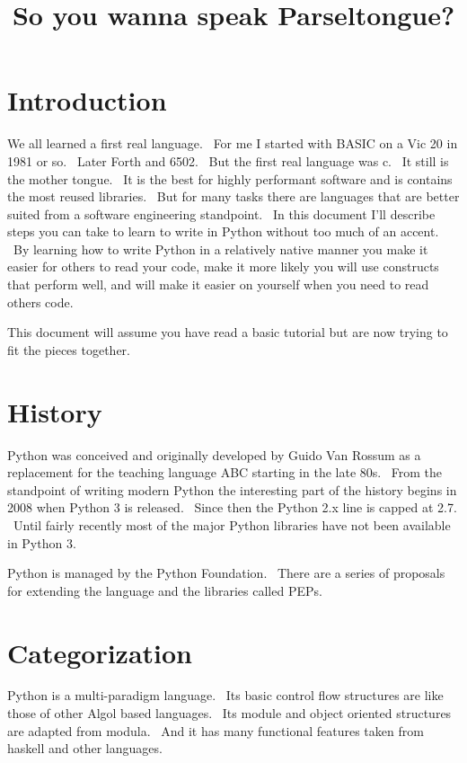 \documentclass[]{article}
\title{So you wanna speak Parseltongue?}
\author{}
\date{}
\begin{document}
\maketitle

\tableofcontents

\section{Introduction}

We all learned a first real language. ~For me I started with BASIC on a
Vic 20 in 1981 or so. ~Later Forth and 6502. ~But the first real
language was c. ~It still is the mother tongue. ~It is the best for
highly performant software and is contains the most reused libraries.
~But for many tasks there are languages that are better suited from a
software engineering standpoint. ~In this document I'll describe steps
you can take to learn to write in Python without too much of an accent.
~By learning how to write Python in a relatively native manner you make
it easier for others to read your code, make it more likely you will use
constructs that perform well, and will make it easier on yourself when
you need to read others code.

This document will assume you have read a basic tutorial but are now
trying to fit the pieces together.

\section{History}

Python was conceived and originally developed by Guido Van Rossum as a
replacement for the teaching language ABC starting in the late 80s.
~From the standpoint of writing modern Python the interesting part of
the history begins in 2008 when Python 3 is released. ~Since then the
Python 2.x line is capped at 2.7. ~Until fairly recently most of the
major Python libraries have not been available in Python 3.

Python is managed by the Python Foundation. ~There are a series of
proposals for extending the language and the libraries called PEPs.

\section{Categorization}

Python is a multi-paradigm language. ~Its basic control flow structures
are like those of other Algol based languages. ~Its module and object
oriented structures are adapted from modula. ~And it has many functional
features taken from haskell and other languages.
\end{document}

